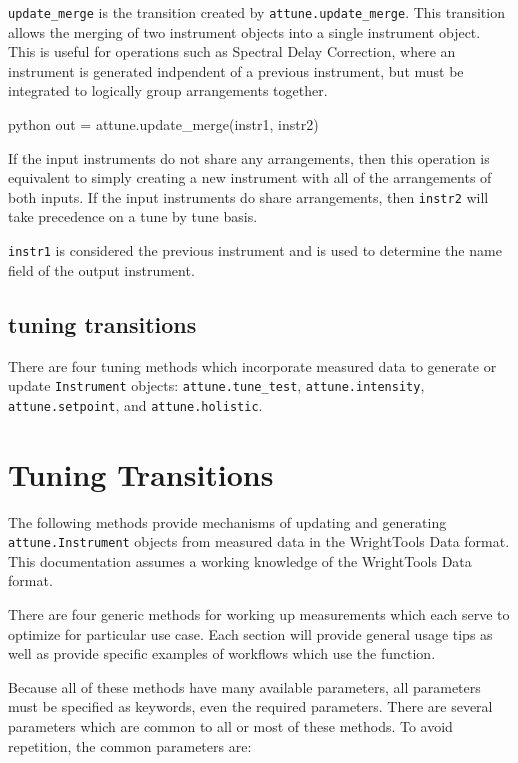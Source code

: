 \texttt{update\_merge} is the transition created by
\texttt{attune.update\_merge}. This transition allows the merging of two
instrument objects into a single instrument object. This is useful for
operations such as Spectral Delay Correction, where an instrument is
generated indpendent of a previous instrument, but must be integrated to
logically group arrangements together.

\begin{codefragment}{python}
out = attune.update_merge(instr1, instr2)
\end{codefragment}

If the input instruments do not share any arrangements, then this
operation is equivalent to simply creating a new instrument with all of
the arrangements of both inputs. If the input instruments do share
arrangements, then \texttt{instr2} will take precedence on a tune by
tune basis.

\texttt{instr1} is considered the previous instrument and is used to
determine the name field of the output instrument.

\hypertarget{tuning-transitions}{%
\subsection{tuning transitions}\label{tuning-transitions}}

There are four tuning methods which incorporate measured data to
generate or update \texttt{Instrument} objects:
\texttt{attune.tune\_test}, \texttt{attune.intensity},
\texttt{attune.setpoint}, and \texttt{attune.holistic}.

\hypertarget{tuningux20transitions}{%
\section{Tuning Transitions}\label{tuningux20transitions}}

The following methods provide mechanisms of updating and generating
\texttt{attune.Instrument} objects from measured data in the
WrightTools Data
format. This documentation assumes a working knowledge of the
WrightTools Data format.

There are four generic methods for working up measurements which each
serve to optimize for particular use case. Each section will provide
general usage tips as well as provide specific examples of workflows
which use the function.

Because all of these methods have many available parameters, all
parameters must be specified as keywords, even the required parameters.
There are several parameters which are common to all or most of these
methods. To avoid repetition, the common parameters are:

